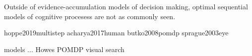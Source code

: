 Outside of evidence-accumulation models of decision making, optimal sequential models of cognitive procesess are not as commonly seen. 

hoppe2019multistep
acharya2017human
butko2008pomdp
sprague2003eye

models ...
Howes
POMDP visual search















